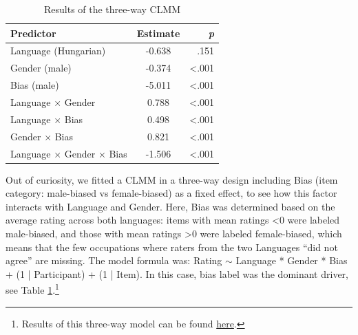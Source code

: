 \documentclass[runningheads]{llncs}
\begin{document}




\begin{table}
\vspace{-14pt}
\raggedleft
\caption{Results of the three-way CLMM}
\label{tab:clmm}
\begin{tabular}{lcr}
\hline
\textbf{Predictor} & \textbf{Estimate} & \textbf{\textit{p}} \\
\hline
Language (Hungarian) & -0.638 & .151 \\
Gender (male) & -0.374 & <.001 \\
Bias (male) & -5.011 & <.001 \\
Language × Gender & 0.788 & <.001 \\
Language × Bias & 0.498 & <.001 \\
Gender × Bias & 0.821 & <.001 \\
Language × Gender × Bias & -1.506 & <.001 \\
\hline
\end{tabular}
\end{table}

Out of curiosity, we fitted a CLMM in a three-way design including Bias (item category: male-biased vs female-biased) as a fixed effect, to see how this factor interacts with Language and Gender. Here, Bias was determined based on the average rating across both languages: items with mean ratings <0 were labeled male-biased, and those with mean ratings >0 were labeled female-biased, which means that the few occupations where raters from the two Languages ``did not agree'' are missing. The model formula was: Rating $\sim$ Language * Gender * Bias + (1 | Participant) + (1 | Item). In this case, bias label was the dominant driver, see Table \ref{tab:clmm}.\footnote{Results of this three-way model can be found \href{https://github.com/partigabor/occupational-gender-bias/blob/main/clmm_with_bias_results.txt}{here}.}
\end{document}

